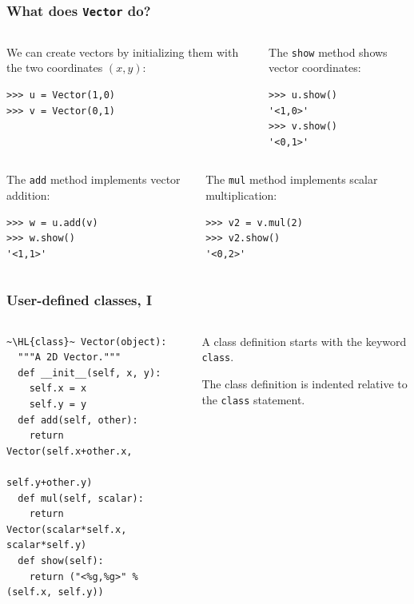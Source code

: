 \documentclass[english,serif,mathserif,xcolor=pdftex,dvipsnames,table]{beamer}
\begin{document}
\begin{frame}[fragile]
  \frametitle{What does \texttt{Vector} do?}
  \begin{columns}
    \begin{column}[t]{0.5\linewidth}
  We can create vectors by initializing them with the two coordinates
  $(x,y)$:
\begin{lstlisting}
>>> u = Vector(1,0)
>>> v = Vector(0,1)
\end{lstlisting}
    \end{column}
    \begin{column}[t]{0.5\linewidth}
      The \texttt{show} method shows vector coordinates:
\begin{lstlisting}
>>> u.show()
'<1,0>'
>>> v.show()
'<0,1>'
\end{lstlisting}
    \end{column}
  \end{columns}

  \+
  \begin{columns}
    \begin{column}[t]{0.5\linewidth}
      The \texttt{add} method implements vector addition:
\begin{lstlisting}
>>> w = u.add(v)
>>> w.show()
'<1,1>'
\end{lstlisting}
    \end{column}
    \begin{column}[t]{0.5\linewidth}
      The \texttt{mul} method implements scalar multiplication:
\begin{lstlisting}
>>> v2 = v.mul(2)
>>> v2.show()
'<0,2>'
\end{lstlisting}
    \end{column}
  \end{columns}
\end{frame}


\begin{frame}[fragile]
  \frametitle{User-defined classes, I}
  \begin{columns}[t]
    \begin{column}{0.5\textwidth}
\begin{lstlisting}
~\HL{class}~ Vector(object):
  """A 2D Vector."""
  def __init__(self, x, y):
    self.x = x
    self.y = y
  def add(self, other):
    return Vector(self.x+other.x,
                  self.y+other.y)
  def mul(self, scalar):
    return Vector(scalar*self.x, scalar*self.y)
  def show(self):
    return ("<%g,%g>" % (self.x, self.y))
\end{lstlisting}
    \end{column}
    \begin{column}{0.5\textwidth}
      \raggedleft
      A class definition starts with the keyword \texttt{class}.

      The class definition is indented relative to the \texttt{class}
      statement.
    \end{column}
  \end{columns}
\end{frame}
\end{document}
